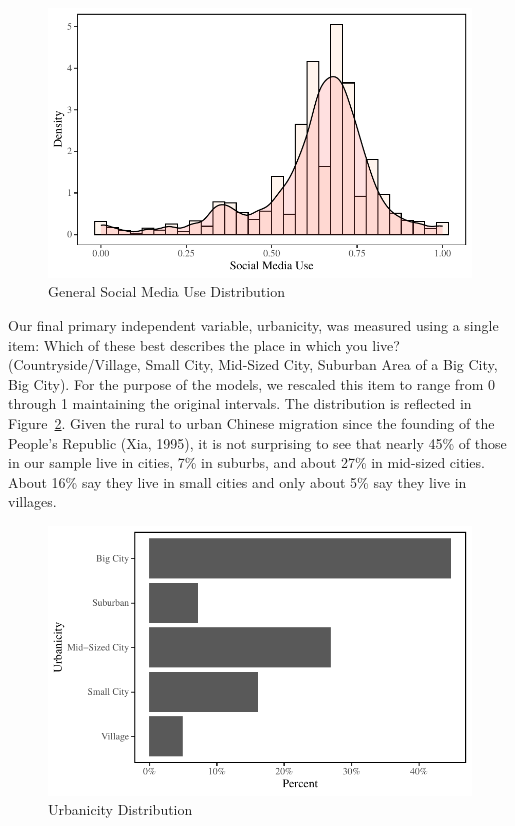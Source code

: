 \documentclass[]{interact}
\theoremstyle{plain}%
\theoremstyle{definition}
\theoremstyle{remark}
\begin{document}
\begin{figure}

{\centering \includegraphics{Social-Isolation-in-China-jg-revised_files/figure-pdf/fig-sm-use-dist-1.pdf}

}

\caption{\label{fig-sm-use-dist}General Social Media Use Distribution}

\end{figure}

Our final primary independent variable, urbanicity, was measured using a
single item: Which of these best describes the place in which you live?
(Countryside/Village, Small City, Mid-Sized City, Suburban Area of a Big
City, Big City). For the purpose of the models, we rescaled this item to
range from 0 through 1 maintaining the original intervals. The
distribution is reflected in Figure~\ref{fig-urban-dist}. Given the
rural to urban Chinese migration since the founding of the People's
Republic (Xia, 1995), it is not surprising to see that nearly 45\% of
those in our sample live in cities, 7\% in suburbs, and about 27\% in
mid-sized cities. About 16\% say they live in small cities and only
about 5\% say they live in villages.

\begin{figure}

{\centering \includegraphics{Social-Isolation-in-China-jg-revised_files/figure-pdf/fig-urban-dist-1.pdf}

}

\caption{\label{fig-urban-dist}Urbanicity Distribution}

\end{figure}
\end{document}
